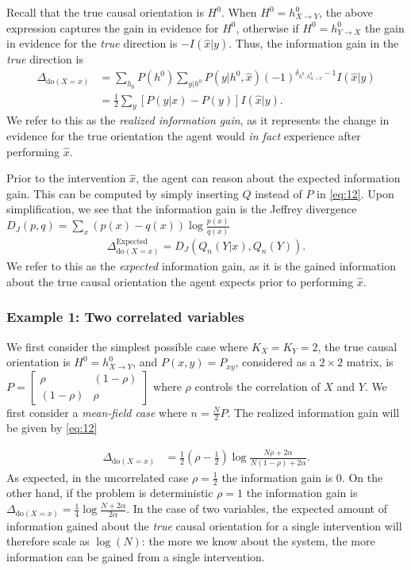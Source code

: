 \documentclass[letterpaper]{article} %
\newcommand{\doo}{\textrm{do}}
\begin{document}
Recall that the true causal orientation is $H^0$. When $H^0 = h^0_{X \rightarrow Y}$, the above expression captures the gain in evidence for $H^0$, otherwise if $H^0 = h^0_{Y \rightarrow X}$ the gain in evidence for the \emph{true} direction is $-I(\hat x | y)$. Thus, the information gain in the \emph{true} direction is
\begin{align}
\Delta_{ \doo(X=x) } & = \sum_{h_0} P(h^0) \sum_{y | h^0} P(y | h^0, \hat x ) (-1)^{ \delta_{h^0, h^0_{X \rightarrow Y} } - 1 } I(\hat x | y) \nonumber \\
& = \frac{1}{2} \sum_{y} \left[P(y | x) - P(y)   \right]  I(\hat x | y).   \label{eq:12}
\end{align}
We refer to this as the \emph{realized information gain}, as it represents the change in evidence for the true orientation the agent would \emph{in fact} experience after performing $\hat x$.

Prior to the intervention $\hat x$, the agent can reason about the expected information gain. This can be computed by simply inserting $Q$ instead of $P$ in \cref{eq:12}. Upon simplification, we see that the information gain is the Jeffrey divergence $D_J(p,q) = \sum_{x} (p(x)-q(x))\log \frac{p(x)}{q(x)}$
\begin{align}
\Delta^\text{Expected}_{\doo(X=x)} = D_J( Q_n(Y | x), Q_n(Y) ).
\label{eq:9}
\end{align}
We refer to this as the \emph{expected} information gain, as it is the gained information about the true causal orientation the agent expects prior to performing $\hat x$.



\subsubsection{Example 1: Two correlated variables}
We first consider the simplest possible case where $K_X = K_Y = 2$, the true causal orientation is $H^0 = h^0_{X\rightarrow Y}$, and $P(x,y)=P_{xy}$, considered as a $2 \times 2$ matrix, is
$ P = \begin{bmatrix}
	\rho  & (1-\rho) \\
	(1-\rho) & \rho
\end{bmatrix} $
 where $\rho$ controls the correlation of $X$ and $Y$. We first consider a \emph{mean-field case} where $n = \frac{N}{2}P$. The realized information gain will be given by \cref{eq:12}

\begin{align}
\Delta_{\doo(X=x) } & = \frac{1}{2}
(\rho-\frac{1}{2} ) \log \frac{ N \rho + 2\alpha }{ N(1-\rho) + 2\alpha }. %
\end{align}
As expected, in the uncorrelated case $\rho= \frac{1}{2}$ the information gain is 0. On the other hand, if the problem is deterministic $\rho = 1$ the information gain is $\Delta_{\doo(X=x) } = \frac{1}{4}\log \frac{ N + 2\alpha }{ 2\alpha}$. In the case of two variables, the expected amount of information gained about the \emph{true} causal orientation for a single intervention will therefore scale as $\log(N)$: the more we know about the system, the more information can be gained from a single intervention.
\end{document}
